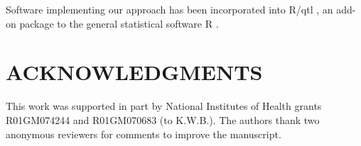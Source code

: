 \documentclass[12pt,letterpaper]{article}
\begin{document}
Software implementing our approach has been incorporated into
R/qtl \citep{Broman2003}, an add-on package
to the general statistical software R \citep{R}.

\section*{ACKNOWLEDGMENTS}

This work was supported in part by National Institutes of Health
grants R01GM074244 and R01GM070683 (to K.W.B.). The authors thank two
anonymous reviewers for comments to improve the manuscript.


\clearpage

\renewcommand*{\refname}{LITERATURE CITED}




\clearpage

\end{document}
